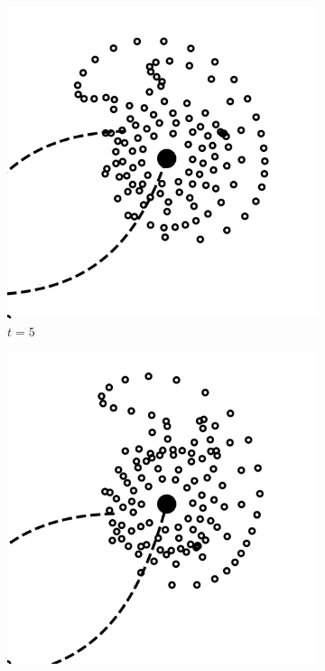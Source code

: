 \documentclass[11pt,twocolumn]{article}
\begin{document}
\begin{figure}[!htbp]
            \begin{subfigure}[b]{0.2\textwidth}
    			\includegraphics[width=\textwidth]{fig_1/Fig3_5_000000_0.pdf}
    				\caption{$t = 5$}
  			\end{subfigure}
            \hfill
            \begin{subfigure}[b]{0.2\textwidth}
    			\includegraphics[width=\textwidth]{fig_1/Fig3_6_000000_0.pdf}

\end{subfigure}
\end{figure}
\end{document}
